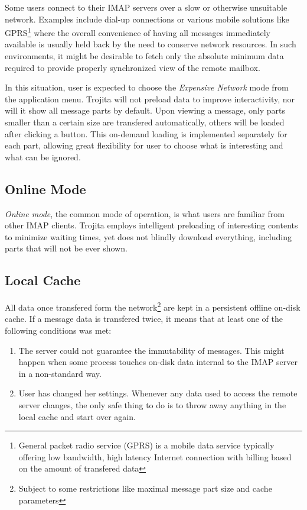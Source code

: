 \documentclass[12pt,notitlepage]{report}
\newcommand{\trojita}{Trojita\xspace}
\begin{document}
Some users connect to their IMAP servers over a slow or otherwise unsuitable
network.  Examples include dial-up connections or various mobile solutions like
GPRS\footnote{General packet radio service (GPRS) is a mobile data service
typically offering low bandwidth, high latency Internet connection with billing
based on the amount of transfered data} where the overall convenience of having
all messages immediately available is usually held back by the need to conserve
network resources.  In such environments, it might be desirable to fetch only
the absolute minimum data required to provide properly synchronized view of the
remote mailbox.

In this situation, user is expected to choose the {\em Expensive Network} mode
from the application menu.  \trojita will not preload data to improve
interactivity, nor will it show all message parts by default.  Upon viewing a
message, only parts smaller than a certain size are transfered automatically,
others will be loaded after clicking a button.  This on-demand loading is
implemented separately for each part, allowing great flexibility for user to
choose what is interesting and what can be ignored.

\subsection{Online Mode}

{\em Online mode}, the common mode of operation, is what users are familiar from
other IMAP clients.  \trojita employs intelligent preloading of interesting
contents to minimize waiting times, yet does not blindly download everything,
including parts that will not be ever shown.

\subsection{Local Cache}

All data once transfered form the network\footnote{Subject to some restrictions
like maximal message part size and cache parameters} are kept in a persistent
offline on-disk cache.  If a message data is transfered twice, it means that at
least one of the following conditions was met:

\begin{enumerate}
    \item{The server could not guarantee the immutability of messages.  This might
        happen when some process touches on-disk data internal to the IMAP
        server in a non-standard way.}
    \item{User has changed her settings.  Whenever any data used to access the
        remote server changes, the only safe thing to do is to throw away
        anything in the local cache and start over again.}
\end{enumerate}
\end{document}
